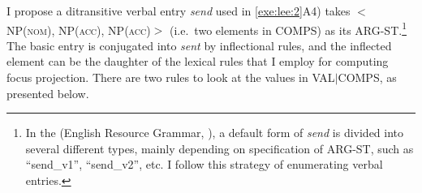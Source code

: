 I propose a ditransitive verbal entry \textit{send} used in
\ref{exe:lee:2}A4) takes \ensuremath{<}NP(\textsc{nom}), NP(\textsc{acc}), NP(\textsc{acc})\ensuremath{>}
(i.e.\ two elements in COMPS) as its ARG-ST.\footnote{In the 
  (English Resource Grammar, \citealt{flickinger:00}), a default form
  of \textit{send} is divided into several different types, mainly
  depending on specification of ARG-ST, such as ``send\_v1'',
  ``send\_v2'', etc.  I follow this strategy of enumerating verbal
  entries.}  The basic entry is conjugated into \textit{sent} by
inflectional rules, and the inflected element can be the daughter of
the lexical rules that I employ for computing focus projection. There
are two rules to look at the values in VAL{$\mid$}COMPS, as presented
below.





